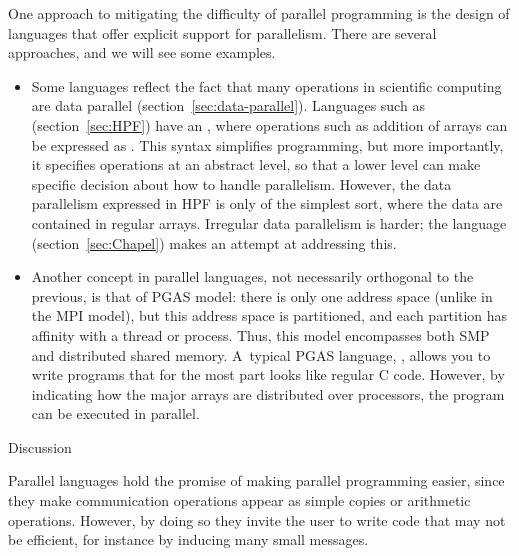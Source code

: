 
One approach to  mitigating the difficulty of parallel programming
is the design of languages that offer explicit support for
parallelism. There are several approaches, and we will see some
examples.
\begin{itemize}
\item Some languages reflect the fact that many operations in
  scientific computing are data parallel
  (section~\ref{sec:data-parallel}). Languages such as 
  (section~\ref{sec:HPF}) have
  an , where operations such as addition of
  arrays can be expressed as . This syntax simplifies
  programming, but more importantly, it specifies operations at an
  abstract level, so that a lower level can make specific decision
  about how to handle parallelism. However, the data parallelism
  expressed in \ac{HPF} is only of the simplest sort, where the data
  are contained in regular arrays. Irregular data parallelism is
  harder; the  language (section~\ref{sec:Chapel})
  makes an attempt at addressing this.
\item Another concept in parallel languages, not necessarily
  orthogonal to the previous, is that of \acf{PGAS} model: there is only
  one address space (unlike in the MPI model), but this address space
  is partitioned, and each partition has affinity with a thread or
  process. Thus, this model encompasses both \ac{SMP} and distributed
  shared memory. A~typical \ac{PGAS} language, , allows you
  to write programs that for the most part looks like regular C code.
  However, by indicating how the major arrays are distributed over
  processors, the program can be executed in parallel.
\end{itemize}

 {Discussion}

Parallel languages hold the promise of making parallel programming
easier, since they make communication operations appear as simple
copies or arithmetic operations. However, by doing so they invite the
user to write code that may not be efficient, for instance by inducing
many small messages. 

